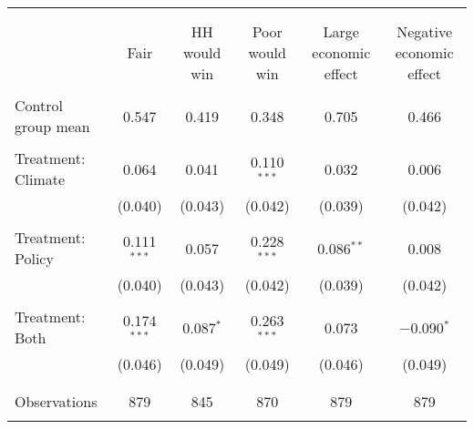 
\begin{tabular}{@{\extracolsep{5pt}}lccccc} 
\\[-1.8ex]\hline 
\hline \\[-1.8ex] 
\\[-1.8ex] & Fair & HH would win & Poor would win & Large economic effect & Negative economic effect \\ 
\hline \\[-1.8ex] 
 Control group mean & 0.547 & 0.419 & 0.348 & 0.705 & 0.466  \\ \hline \\[-1.8ex] Treatment: Climate & 0.064 & 0.041 & 0.110$^{***}$ & 0.032 & 0.006 \\ 
  & (0.040) & (0.043) & (0.042) & (0.039) & (0.042) \\ 
  & & & & & \\ 
 Treatment: Policy & 0.111$^{***}$ & 0.057 & 0.228$^{***}$ & 0.086$^{**}$ & 0.008 \\ 
  & (0.040) & (0.043) & (0.042) & (0.039) & (0.042) \\ 
  & & & & & \\ 
 Treatment: Both & 0.174$^{***}$ & 0.087$^{*}$ & 0.263$^{***}$ & 0.073 & $-$0.090$^{*}$ \\ 
  & (0.046) & (0.049) & (0.049) & (0.046) & (0.049) \\ 
  & & & & & \\ 
\hline \\[-1.8ex] 

Observations & 879 & 845 & 870 & 879 & 879 \\ 
\hline 
\hline \\[-1.8ex] 
\end{tabular} 